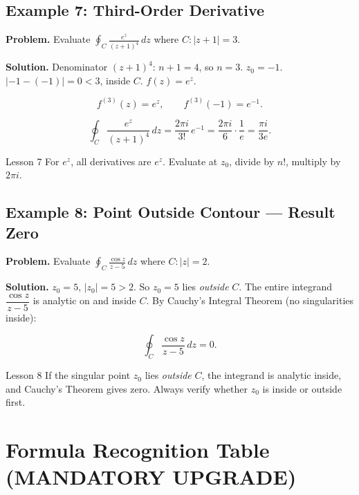 \documentclass[12pt,a4paper]{article}
\begin{document}
\subsection*{Example 7: Third-Order Derivative}

\textbf{Problem.} Evaluate $\displaystyle\oint_{C} \frac{e^z}{(z+1)^4}\,dz$
where $C: |z+1| = 3$.

\textbf{Solution.}
Denominator $(z+1)^4$: $n+1 = 4$, so $n = 3$. $z_0 = -1$.
$|-1 - (-1)| = 0 < 3$, inside $C$. $f(z) = e^z$.

\[
  f^{(3)}(z) = e^z, \qquad f^{(3)}(-1) = e^{-1}.
\]

\[
  \oint_{C} \frac{e^z}{(z+1)^4}\,dz = \frac{2\pi i}{3!}\,e^{-1}
  = \frac{2\pi i}{6}\cdot\frac{1}{e} = \frac{\pi i}{3e}.
\]

\begin{learnbox}{Lesson 7}
For $e^z$, all derivatives are $e^z$.  Evaluate at $z_0$, divide by $n!$,
multiply by $2\pi i$.
\end{learnbox}

\subsection*{Example 8: Point Outside Contour --- Result Zero}

\textbf{Problem.} Evaluate $\displaystyle\oint_{C} \frac{\cos z}{z - 5}\,dz$
where $C: |z| = 2$.

\textbf{Solution.}
$z_0 = 5$, $|z_0| = 5 > 2$. So $z_0 = 5$ lies \emph{outside} $C$.
The entire integrand $\dfrac{\cos z}{z - 5}$ is analytic on and inside $C$.
By Cauchy's Integral Theorem (no singularities inside):

\[
  \oint_{C} \frac{\cos z}{z - 5}\,dz = 0.
\]

\begin{learnbox}{Lesson 8}
If the singular point $z_0$ lies \emph{outside} $C$, the integrand is analytic inside,
and Cauchy's Theorem gives zero. Always verify whether $z_0$ is inside or outside first.
\end{learnbox}

\section{Formula Recognition Table (MANDATORY UPGRADE)}
\end{document}
